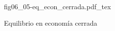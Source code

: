 \begin{figure}[h]
\centering
\def\svgwidth{0.5\textwidth}
{fig06_05-eq_econ_cerrada.pdf_tex}
\caption{Equilibrio en economía cerrada}
\label{fig06_05-eq_econ_cerrada}
\end{figure}